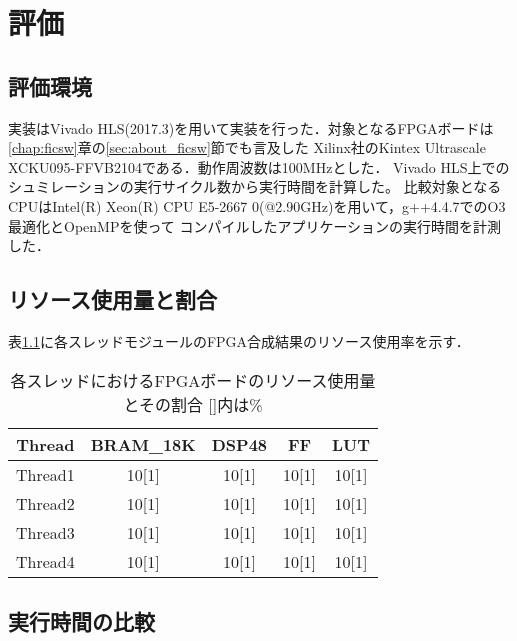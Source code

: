 \chapter{評価}
{
\label{chap:eval}

\section{評価環境}
\label{sec:eval_env}
実装はVivado HLS(2017.3)を用いて実装を行った．対象となるFPGAボードは\ref{chap:ficsw}章の\ref{sec:about_ficsw}節でも言及した
Xilinx社のKintex Ultrascale　XCKU095-FFVB2104である．動作周波数は100MHzとした．
Vivado HLS上でのシュミレーションの実行サイクル数から実行時間を計算した。
比較対象となるCPUはIntel(R) Xeon(R) CPU E5-2667 0(@2.90GHz)を用いて，g++4.4.7でのO3最適化とOpenMPを使って
コンパイルしたアプリケーションの実行時間を計測した．

\section{リソース使用量と割合}
\label{sec:resource_util}
表\ref{table:resource_util}に各スレッドモジュールのFPGA合成結果のリソース使用率を示す．

\begin{table}[p]
    \begin{center}
    \caption{各スレッドにおけるFPGAボードのリソース使用量とその割合 []内は\%}
    \label{table:resource_util}
    \begin{tabular}{|c|c|c|c|c|} \hline
    \multicolumn{1}{|c|}{Thread} & \multicolumn{1}{|c|}{BRAM\_18K} & \multicolumn{1}{|c|}{DSP48} & \multicolumn{1}{|c|}{FF} & \multicolumn{1}{|c|}{LUT} \\ \hline \hline
    Thread1       & 10[1] & 10[1] & 10[1] & 10[1] \\ \hline
    Thread2       & 10[1] & 10[1] & 10[1] & 10[1] \\ \hline
    Thread3       & 10[1] & 10[1] & 10[1] & 10[1] \\ \hline
    Thread4       & 10[1] & 10[1] & 10[1] & 10[1] \\ \hline
    \end{tabular}
    \end{center}
\end{table}


\section{実行時間の比較}
\label{sec:resource_util}

}
